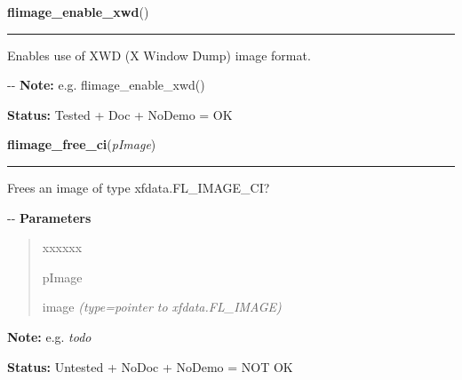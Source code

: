     \label{xformslib:flflimage:flimage_enable_xwd}

    \vspace{0.5ex}

\hspace{.8\funcindent}\begin{boxedminipage}{\funcwidth}

    \raggedright \textbf{flimage\_enable\_xwd}()

    \vspace{-1.5ex}

    \rule{\textwidth}{0.5\fboxrule}
\setlength{\parskip}{2ex}

Enables use of XWD (X Window Dump) image format.

-{}-
\setlength{\parskip}{1ex}
\textbf{Note:} 
e.g. flimage\_enable\_xwd()


\textbf{Status:} 
Tested + Doc + NoDemo = OK


    \end{boxedminipage}

    \label{xformslib:flflimage:flimage_free_ci}

    \vspace{0.5ex}

\hspace{.8\funcindent}\begin{boxedminipage}{\funcwidth}

    \raggedright \textbf{flimage\_free\_ci}(\textit{pImage})

    \vspace{-1.5ex}

    \rule{\textwidth}{0.5\fboxrule}
\setlength{\parskip}{2ex}

Frees an image of type xfdata.FL\_IMAGE\_CI?

-{}-
\setlength{\parskip}{1ex}
      \textbf{Parameters}
      \vspace{-1ex}

      \begin{quote}
        \begin{Ventry}{xxxxxx}

          \item[pImage]


image
            {\it (type=pointer to xfdata.FL\_IMAGE)}

        \end{Ventry}

      \end{quote}

\textbf{Note:} 
e.g. \emph{todo}


\textbf{Status:} 
Untested + NoDoc + NoDemo = NOT OK


    \end{boxedminipage}

